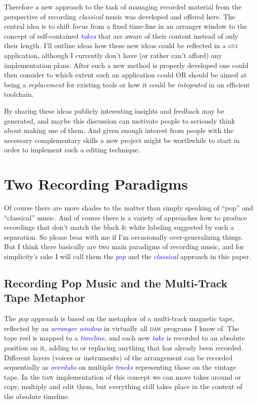 \documentclass[11pt,a4paper]{article}
\newcommand*{\term}[1]{\textcolor{blue}{\emph{#1}}}
\begin{document}
Therefore a new approach to the task of managing
recorded material from the perspective of recording \emph{classical} music was developed and offered here.
The central idea is to shift focus from a fixed time-line in an arranger
window to the concept of self-contained \term{takes} that are aware of their
content instead of only their length.
I'll outline ideas how these new ideas could be reflected in a \textsc{gui}
application, although I currently don't have (or rather can't afford) any
implementation plans.
After such a new method is properly developed one could then consider to which extent such an
application could OR should be aimed at being a \emph{replacement} for existing
tools or how it could be \emph{integrated} in an efficient toolchain.

By sharing these ideas publicly interesting insights and
feedback may be generated, and maybe this discussion can motivate people to seriously think about
making use of them.
And given enough interest from people with the necessary complementary skills a new project might be worthwhile to start in order to implement such a editing technique.

\section{Two Recording Paradigms}

Of course there are more shades to the matter  than simply speaking of “pop” and
“classical” music.
And of course there is a variety of approaches how to produce recordings that
don't match the black \& white labeling suggested by such a separation.
So please bear with me if I'm occasionally over-generalizing things.
But I think there basically are two main paradigms of recording music, and for
simplicity's sake I will call them the \term{pop} and the \term{classical}
approach in this paper.

\subsection{Recording Pop Music and the Multi-Track Tape Metaphor}

The \emph{pop} approach is based on the metaphor of a multi-track magnetic tape,
reflected by an \term{arranger window} in virtually all \textsc{daw} programs I
know of.
The tape reel is mapped to a \term{timeline}, and each new \term{take} is recorded to
an absolute position on it, adding to or replacing anything that has already
been recorded.
Different layers (voices or instruments) of the arrangement can be recorded
sequentially as \term{overdubs} on multiple \term{tracks} representing those on the
vintage tape.
In the \textsc{daw} implementation of this concept we can move takes around or copy,
multiply and edit them, but everything still takes place in the context of the
absolute timeline.
\end{document}
